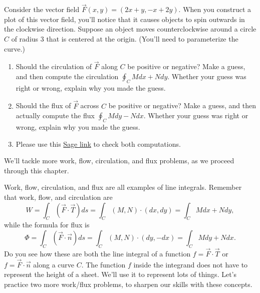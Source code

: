 \begin{problem}
%
 Consider the vector field $\vec F(x,y) = (2x+y,-x+2y)$. When you construct a plot of this vector field, you'll notice that it causes objects to spin outwards in the clockwise direction. Suppose an object moves counterclockwise around a circle $C$ of radius 3 that is centered at the origin. (You'll need to parameterize the curve.)
\begin{enumerate}
 \item Should the circulation of $\vec F$ along $C$ be positive or negative?  Make a guess, and then compute the circulation $\oint_C Mdx+Ndy$. Whether your guess was right or wrong, explain why you made the guess. 
 \item Should the flux of $\vec F$ across $C$ be positive or negative? Make a guess, and then actually compute the flux $\oint_C Mdy-Ndx$. Whether your guess was right or wrong, explain why you made the guess. 
 \item Please use this \href{\sageworkfluxurl}{Sage link} to check both computations. 
\end{enumerate}
\end{problem}

We'll tackle more work, flow, circulation, and flux problems, as we proceed through this chapter.


















Work, flow, circulation, and flux are all examples of line integrals.  Remember that work, flow, and circulation are 
$$W=\int_C (\vec F\cdot \vec T)ds =\int_C (M,N)\cdot(dx,dy) =  \int_C Mdx+Ndy,$$
while the formula for flux is
$$\Phi=\int_C (\vec F\cdot \vec n)ds =\int_C (M,N)\cdot(dy,-dx) =  \int_C Mdy+Ndx.$$
Do you see how these are both the line integral of a function $f = \vec F\cdot \vec T$ or $f=\vec F\cdot \vec n$ along a curve $C$.  The function $f$ inside the integrand does not have to represent the height of a sheet. We'll use it to represent lots of things.  Let's practice two more work/flux problems, to sharpen our skills with these concepts. 






